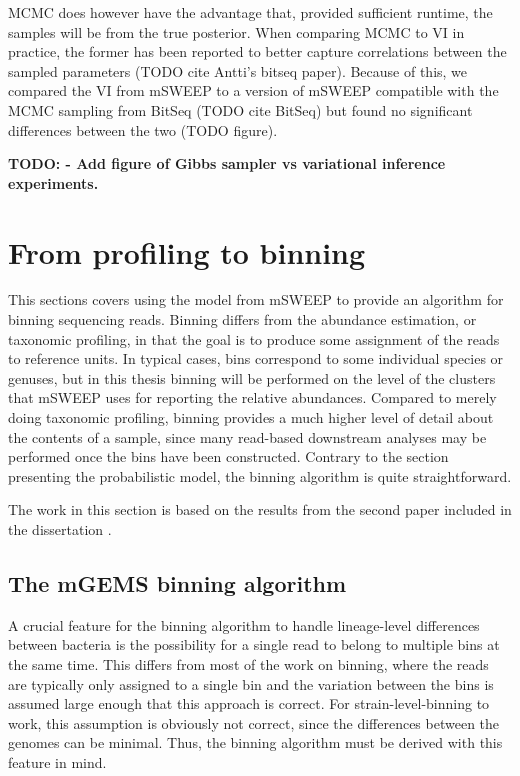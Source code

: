 \documentclass[officiallayout]{tktla}
\begin{document}
MCMC does however have the advantage that, provided sufficient
runtime, the samples will be from the true posterior. When comparing
MCMC to VI in practice, the former has been reported to better capture
correlations between the sampled parameters (TODO cite Antti's bitseq
paper). Because of this, we compared the VI from mSWEEP to a version
of mSWEEP compatible with the MCMC sampling from BitSeq (TODO cite
BitSeq) but found no significant differences between the two (TODO figure).

\textbf{TODO: - Add figure of Gibbs sampler vs variational inference experiments.}

\section{From profiling to binning}
\label{section:binning}

This sections covers using the model from mSWEEP to provide an
algorithm for binning sequencing reads. Binning differs from the
abundance estimation, or taxonomic profiling, in that the goal is to
produce some assignment of the reads to reference units. In typical
cases, bins correspond to some individual species or genuses, but in
this thesis binning will be performed on the level of the clusters
that mSWEEP uses for reporting the relative abundances. Compared to
merely doing taxonomic profiling, binning provides a much higher level
of detail about the contents of a sample, since many read-based
downstream analyses may be performed once the bins have been
constructed. Contrary to the section presenting the probabilistic
model, the binning algorithm is quite straightforward.

The work in this section is based on the results from the second paper
included in the dissertation \citep{maklin_bacterial_2021}.

\subsection{The mGEMS binning algorithm}

A crucial feature for the binning algorithm to handle lineage-level
differences between bacteria is the possibility for a single read to
belong to multiple bins at the same time. This differs from most of
the work on binning, where the reads are typically only assigned to a
single bin and the variation between the bins is assumed large enough
that this approach is correct. For strain-level-binning to work, this
assumption is obviously not correct, since the differences between the
genomes can be minimal. Thus, the binning algorithm must be derived
with this feature in mind.
\end{document}
